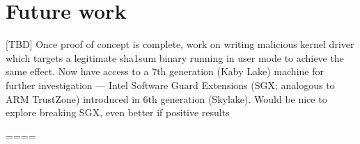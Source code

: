 \section{Future work}
\label{sec:future}

[TBD] Once proof of concept is complete, work on writing malicious kernel driver
which targets a legitimate sha1sum binary running in user mode to achieve the
same effect.
Now have access to a 7th generation (Kaby Lake) machine for further
investigation — Intel Software Guard Extensions (SGX; analogous to ARM
TrustZone) introduced in 6th generation (Skylake).
Would be nice to explore breaking SGX, even better if positive results

====
